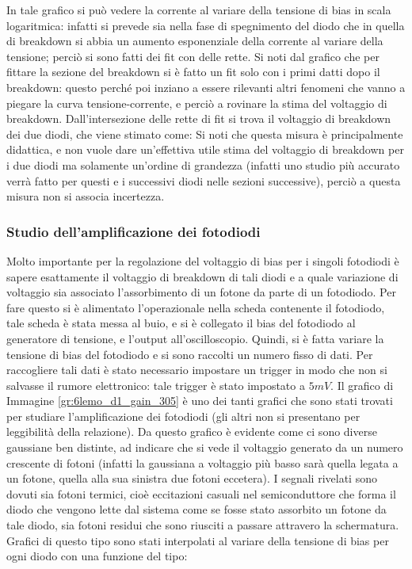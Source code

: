 In tale grafico si può vedere la corrente al variare della tensione di bias in scala logaritmica: infatti si prevede sia nella fase di spegnimento del diodo che in quella di breakdown si abbia un aumento esponenziale della corrente al variare della tensione; perciò si sono fatti dei fit con delle rette. Si noti dal grafico che per fittare la sezione del breakdown si è fatto un fit solo con i primi datti dopo il breakdown: questo perché poi inziano a essere rilevanti altri fenomeni che vanno a piegare la curva tensione-corrente, e perciò a rovinare la stima del voltaggio di breakdown.
Dall'intersezione delle rette di fit si trova il voltaggio di breakdown dei due diodi, che viene stimato come:
Si noti che questa misura è principalmente didattica, e non vuole dare un'effettiva utile stima del voltaggio di breakdown per i due diodi ma solamente un'ordine di grandezza
(infatti uno studio più accurato verrà fatto per questi e i successivi diodi nelle sezioni successive), perciò a questa misura non si associa incertezza.

\subsubsection{Studio dell'amplificazione dei fotodiodi}
Molto importante per la regolazione del voltaggio di bias per i singoli fotodiodi è sapere esattamente il voltaggio di breakdown di tali diodi e a quale variazione di
voltaggio sia associato l'assorbimento di un fotone da parte di un fotodiodo. Per fare questo si è alimentato l'operazionale nella scheda contenente il fotodiodo, tale
scheda è stata messa al buio, e si è collegato il bias del fotodiodo al generatore di tensione, e l'output all'oscilloscopio. Quindi, si è fatta variare la tensione
di bias del fotodiodo e si sono raccolti un numero fisso di dati. Per raccogliere tali dati è stato necessario impostare un trigger in modo che non si salvasse il rumore elettronico: tale trigger è stato impostato a $5 mV$.
Il grafico di Immagine \ref{gr:6lemo_d1_gain_305} è uno dei tanti grafici che sono stati
trovati per studiare l'amplificazione dei fotodiodi (gli altri non si presentano per leggibilità della relazione). Da questo grafico è evidente come ci sono diverse gaussiane ben distinte, ad indicare che si vede il voltaggio
generato da un numero crescente di fotoni (infatti la gaussiana a voltaggio più basso sarà quella legata a un fotone, quella alla sua sinistra due fotoni eccetera).
I segnali rivelati sono dovuti sia fotoni termici, cioè eccitazioni casuali nel semiconduttore che forma il diodo che vengono lette dal sistema come se fosse stato assorbito un fotone
da tale diodo, sia fotoni residui che sono riusciti a passare attravero la schermatura. Grafici di questo tipo sono stati interpolati al variare della tensione di bias per ogni diodo con una funzione del tipo:

